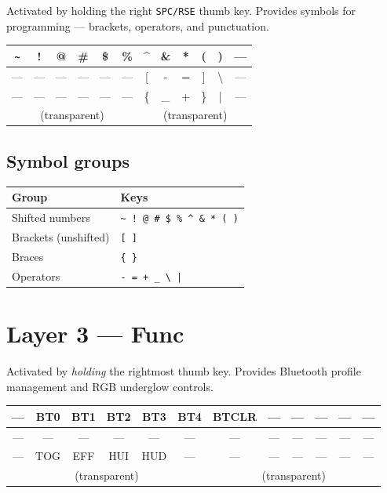 \documentclass[11pt, letterpaper]{article}
\begin{document}
Activated by holding the right \texttt{SPC/RSE} thumb key. Provides
symbols for programming — brackets, operators, and punctuation.

\begin{center}
\renewcommand{\arraystretch}{1.4}
\begin{tabular}{|c|c|c|c|c|c||c|c|c|c|c|c|}
\hline
\texttt{\~{}} & ! & @ & \# & \$ & \% & \^{} & \& & * & ( & ) & --- \\
\hline
--- & --- & --- & --- & --- & --- & [ & - & = & ] & \textbackslash & --- \\
\hline
--- & --- & --- & --- & --- & --- & \{ & \_ & + & \} & | & --- \\
\hline
\multicolumn{6}{|c|}{(transparent)} &
\multicolumn{6}{c|}{(transparent)} \\
\hline
\end{tabular}
\end{center}

\subsection*{Symbol groups}

\begin{tabular}{ll}
\toprule
\textbf{Group}             & \textbf{Keys} \\
\midrule
Shifted numbers            & \texttt{\~{} ! @ \# \$ \% \^{} \& * ( )} \\
Brackets (unshifted)       & \texttt{[ ]} \\
Braces                     & \texttt{\{ \}} \\
Operators                  & \texttt{- = + \_ \textbackslash{} |} \\
\bottomrule
\end{tabular}

\section{Layer 3 — Func}

Activated by \emph{holding} the rightmost thumb key. Provides Bluetooth
profile management and RGB underglow controls.

\begin{center}
\renewcommand{\arraystretch}{1.4}
\begin{tabular}{|c|c|c|c|c|c||c|c|c|c|c|c|}
\hline
--- & BT0 & BT1 & BT2 & BT3 & BT4 & BTCLR & --- & --- & --- & --- & --- \\
\hline
--- & --- & --- & --- & --- & --- & --- & --- & --- & --- & --- & --- \\
\hline
--- & TOG & EFF & HUI & HUD & --- & --- & --- & --- & --- & --- & --- \\
\hline
\multicolumn{6}{|c|}{(transparent)} &
\multicolumn{6}{c|}{(transparent)} \\
\hline
\end{tabular}
\end{center}
\end{document}
